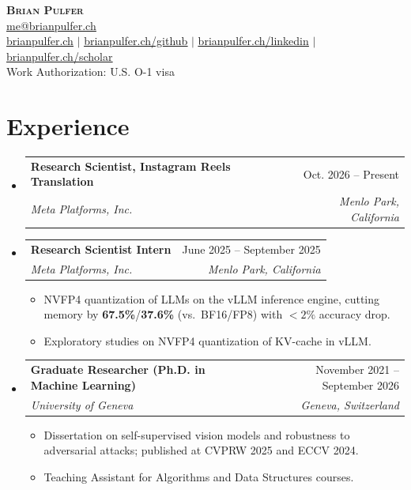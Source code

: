 \documentclass[letterpaper,11pt]{article}
\makeatletter
\newcommand{\resumeItem}[1]{
  \item\small{
    {#1 \vspace{-2pt}}
  }
}
\newcommand{\resumeSubheading}[4]{
  \vspace{-2pt}\item
    \begin{tabular*}{0.97\textwidth}[t]{l@{\extracolsep{\fill}}r}
      \textbf{#1} & #2 \\
      \textit{\small#3} & \textit{\small #4} \\
    \end{tabular*}\vspace{-7pt}
}
\newcommand{\resumeSubHeadingListStart}{\begin{itemize}[leftmargin=0.15in, label={}]}
\newcommand{\resumeSubHeadingListEnd}{\end{itemize}}
\newcommand{\resumeItemListStart}{\begin{itemize}}
\newcommand{\resumeItemListEnd}{\end{itemize}\vspace{-5pt}}
\makeatother
\begin{document}

\begin{center}
    \textbf{\Huge \scshape Brian Pulfer} \\ \vspace{1pt}
    \href{mailto:me@brianpulfer.ch}{\underline{me@brianpulfer.ch}} \\ \vspace{1pt}
    \href{https://www.brianpulfer.ch}{\underline{brianpulfer.ch}} $|$
    \href{https://brianpulfer.ch/github}{\underline{brianpulfer.ch/github}} $|$
    \href{https://brianpulfer.ch/linkedin}{\underline{brianpulfer.ch/linkedin}} $|$
    \href{https://brianpulfer.ch/scholar}{\underline{brianpulfer.ch/scholar}}
   \\ \vspace{1pt}
    \small{Work Authorization: U.S. O-1 visa}
   \\
\end{center}

\section{Experience}
  \resumeSubHeadingListStart

    \resumeSubheading
      {Research Scientist, Instagram Reels Translation}{Oct. 2026 -- Present}
      {Meta Platforms, Inc.}{Menlo Park, California}

    \resumeSubheading
      {Research Scientist Intern}{June 2025 -- September 2025}
      {Meta Platforms, Inc.}{Menlo Park, California}
      \resumeItemListStart
      \resumeItem{NVFP4 quantization of LLMs on the vLLM inference engine, cutting memory by \textbf{67.5\%}/\textbf{37.6\%} (vs.\ BF16/FP8) with $< 2\%$ accuracy drop.}
      \resumeItem{Exploratory studies on NVFP4 quantization of KV-cache in vLLM.}
      \resumeItemListEnd
  
    \resumeSubheading
      {Graduate Researcher (Ph.D. in Machine Learning)}{November 2021 -- September 2026}
      {University of Geneva}{Geneva, Switzerland}
      \resumeItemListStart
      \resumeItem{Dissertation on self-supervised vision models and robustness to adversarial attacks; published at CVPRW 2025 and ECCV 2024.}
      \resumeItem{Teaching Assistant for Algorithms and Data Structures courses.}
      \resumeItemListEnd
\resumeSubHeadingListEnd
\end{document}
